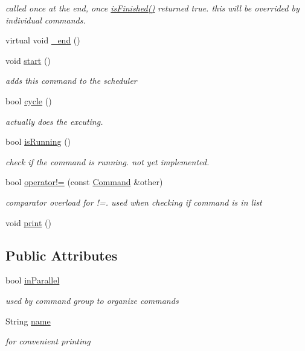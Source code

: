\begin{DoxyCompactItemize}
\begin{DoxyCompactList}\small\item\em called once at the end, once \hyperlink{classCommand_ae5846b4332a262e055c7a96759fa18f2}{is\-Finished()} returned true. this will be overrided by individual commands. \end{DoxyCompactList}\item 
virtual void \hyperlink{classCommand_a9173c74652cb69c8807170bf16151ae2}{\-\_\-end} ()
\item 
void \hyperlink{classCommand_aef139180669b92534dd05a89323fb82f}{start} ()
\begin{DoxyCompactList}\small\item\em adds this command to the scheduler \end{DoxyCompactList}\item 
bool \hyperlink{classCommand_a93e75689d86c0a8675c1f769f721d646}{cycle} ()
\begin{DoxyCompactList}\small\item\em actually does the excuting. \end{DoxyCompactList}\item 
bool \hyperlink{classCommand_a0252c920dd7114c29ef04526cfd0f39a}{is\-Running} ()
\begin{DoxyCompactList}\small\item\em check if the command is running. not yet implemented. \end{DoxyCompactList}\item 
bool \hyperlink{classCommand_a51103f3b209bdbd421f40a38521a9e5e}{operator!=} (const \hyperlink{classCommand}{Command} \&other)
\begin{DoxyCompactList}\small\item\em comparator overload for !=. used when checking if command is in list \end{DoxyCompactList}\item 
void \hyperlink{classCommand_a03a7f03b29c4cbb748a15c9c83233023}{print} ()
\end{DoxyCompactItemize}
\subsection*{Public Attributes}
\begin{DoxyCompactItemize}
\item 
bool \hyperlink{classCommand_ad6e763c58ca2751de879c6eb3f3ae48f}{in\-Parallel}
\begin{DoxyCompactList}\small\item\em used by command group to organize commands \end{DoxyCompactList}\item 
String \hyperlink{classCommand_a19f7ad73ca8599ad47f9b7bcccc52610}{name}
\begin{DoxyCompactList}\small\item\em for convenient printing \end{DoxyCompactList}\end{DoxyCompactItemize}
